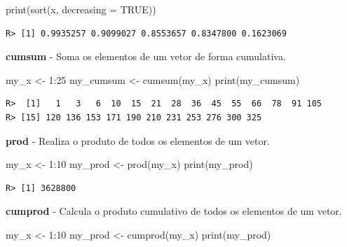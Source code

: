 \documentclass[
  11pt,
]{book}
\newenvironment{Shaded}{\begin{snugshade}}{\end{snugshade}}
\newcommand{\AttributeTok}[1]{\textcolor[rgb]{0.61,0.61,0.61}{#1}}
\newcommand{\ConstantTok}[1]{\textcolor[rgb]{0,0,0}{#1}}
\newcommand{\DecValTok}[1]{\textcolor[rgb]{0.06,0.06,0.06}{#1}}
\newcommand{\FunctionTok}[1]{\textcolor[rgb]{0,0,0}{#1}}
\newcommand{\NormalTok}[1]{#1}
\newcommand{\OtherTok}[1]{\textcolor[rgb]{0.37,0.37,0.37}{#1}}
\newcommand{\SpecialCharTok}[1]{\textcolor[rgb]{0,0,0}{#1}}
\begin{document}
\begin{Shaded}
\begin{Highlighting}[]
\FunctionTok{print}\NormalTok{(}\FunctionTok{sort}\NormalTok{(x, }\AttributeTok{decreasing =} \ConstantTok{TRUE}\NormalTok{))}
\end{Highlighting}
\end{Shaded}

\begin{verbatim}
R> [1] 0.9935257 0.9099027 0.8553657 0.8347800 0.1623069
\end{verbatim}

\textbf{cumsum} - Soma os elementos de um vetor de forma cumulativa.

\begin{Shaded}
\begin{Highlighting}[]
\NormalTok{my\_x }\OtherTok{\textless{}{-}} \DecValTok{1}\SpecialCharTok{:}\DecValTok{25}
\NormalTok{my\_cumsum }\OtherTok{\textless{}{-}} \FunctionTok{cumsum}\NormalTok{(my\_x)}
\FunctionTok{print}\NormalTok{(my\_cumsum)}
\end{Highlighting}
\end{Shaded}

\begin{verbatim}
R>  [1]   1   3   6  10  15  21  28  36  45  55  66  78  91 105
R> [15] 120 136 153 171 190 210 231 253 276 300 325
\end{verbatim}

\textbf{prod} - Realiza o produto de todos os elementos de um vetor.

\begin{Shaded}
\begin{Highlighting}[]
\NormalTok{my\_x }\OtherTok{\textless{}{-}} \DecValTok{1}\SpecialCharTok{:}\DecValTok{10}
\NormalTok{my\_prod }\OtherTok{\textless{}{-}} \FunctionTok{prod}\NormalTok{(my\_x)}
\FunctionTok{print}\NormalTok{(my\_prod)}
\end{Highlighting}
\end{Shaded}

\begin{verbatim}
R> [1] 3628800
\end{verbatim}

\textbf{cumprod} - Calcula o produto cumulativo de todos os elementos de um vetor.

\begin{Shaded}
\begin{Highlighting}[]
\NormalTok{my\_x }\OtherTok{\textless{}{-}} \DecValTok{1}\SpecialCharTok{:}\DecValTok{10}
\NormalTok{my\_prod }\OtherTok{\textless{}{-}} \FunctionTok{cumprod}\NormalTok{(my\_x)}
\FunctionTok{print}\NormalTok{(my\_prod)}
\end{Highlighting}
\end{Shaded}
\end{document}
